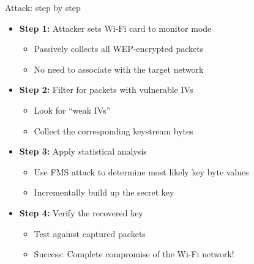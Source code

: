 \documentclass[aspectratio=169, lualatex, handout]{beamer}
\begin{document}
\begin{frame}{Attack: step by step}
	\begin{itemize}
		\item \textbf{Step 1:} Attacker sets Wi-Fi card to monitor mode
		      \begin{itemize}
			      \item Passively collects all WEP-encrypted packets
			      \item No need to associate with the target network
		      \end{itemize}
		\item \textbf{Step 2:} Filter for packets with vulnerable IVs
		      \begin{itemize}
			      \item Look for ``weak IVs''
			      \item Collect the corresponding keystream bytes
		      \end{itemize}
		\item \textbf{Step 3:} Apply statistical analysis
		      \begin{itemize}
			      \item Use FMS attack to determine most likely key byte values
			      \item Incrementally build up the secret key
		      \end{itemize}
		\item \textbf{Step 4:} Verify the recovered key
		      \begin{itemize}
			      \item Test against captured packets
			      \item Success: Complete compromise of the Wi-Fi network!
		      \end{itemize}
	\end{itemize}
\end{frame}
\end{document}
